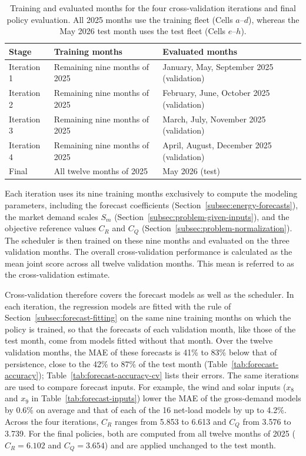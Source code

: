 \documentclass{UNCC-thesis}
\begin{document}
\begin{table}[htbp]
  \centering
  \footnotesize
  \caption[Training and evaluated months]{Training and evaluated months for the four cross-validation iterations
  and final policy evaluation. All 2025 months use the training fleet (Cells
  \(a\)--\(d\)), whereas the May 2026 test month uses the test fleet (Cells \(e\)--\(h\)).}
  \label{tab:data-splits}
  \begin{tabular}{@{}lll@{}}
    \toprule
    Stage & Training months & Evaluated months \\
    \midrule
    Iteration 1 & Remaining nine months of 2025 & January, May, September 2025 (validation) \\
    Iteration 2 & Remaining nine months of 2025 & February, June, October 2025 (validation) \\
    Iteration 3 & Remaining nine months of 2025 & March, July, November 2025 (validation) \\
    Iteration 4 & Remaining nine months of 2025 & April, August, December 2025 (validation) \\
    \addlinespace
    Final & All twelve months of 2025 & May 2026 (test) \\
    \bottomrule
  \end{tabular}
\end{table}

Each iteration uses its nine training months exclusively to compute the modeling
parameters, including the forecast coefficients (Section~\ref{subsec:energy-forecasts}), the
market demand scales \(S_m\) (Section~\ref{subsec:problem-given-inputs}), and the
objective reference values \(C_R\) and \(C_Q\)
(Section~\ref{subsec:problem-normalization}). The scheduler is then trained on these
nine months and evaluated on the three validation months. The overall cross-validation
performance is calculated as the mean joint score across all twelve validation months. This mean
is referred to as the cross-validation estimate.

Cross-validation therefore covers the forecast models as well as the scheduler. In each
iteration, the regression models are fitted with the rule of
Section~\ref{subsec:forecast-fitting} on the same nine training months on which the policy is
trained, so that the forecasts of each validation month, like those of the test month, come from
models fitted without that month. Over the twelve validation months, the MAE of these forecasts
is 41\% to 83\% below that of persistence, close to the 42\% to 87\% of the test month
(Table~\ref{tab:forecast-accuracy}); Table~\ref{tab:forecast-accuracy-cv} lists their errors.
The same iterations are used to compare forecast inputs. For example, the wind and solar inputs
(\(x_8\) and \(x_9\) in Table~\ref{tab:forecast-inputs}) lower the MAE of the gross-demand models
by 0.6\% on average and that of each of the 16 net-load models by up to 4.2\%. Across the four
iterations, \(C_R\) ranges from 5.853 to 6.613 and \(C_Q\) from 3.576 to 3.739. For the final
policies, both are computed from all twelve months of 2025 (\(C_R=6.102\) and \(C_Q=3.654\)) and
are applied unchanged to the test month.
\end{document}
